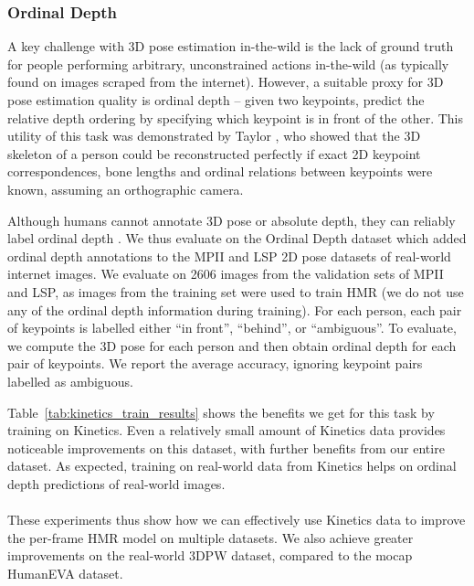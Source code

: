 \documentclass[10pt,twocolumn,letterpaper]{article}
\begin{document}
\subsubsection{Ordinal Depth}

A key challenge with 3D pose estimation in-the-wild is the lack of ground truth for people performing arbitrary, unconstrained actions in-the-wild (as typically found on images scraped from the internet).  
However, a suitable proxy for 3D pose estimation quality is ordinal depth \cite{taylor_cviu_2000, pavlakos_cvpr_2018b} -- \ie given two keypoints, predict the relative depth ordering by specifying which keypoint is in front of the other.
This utility of this task was demonstrated by Taylor \cite{taylor_cviu_2000}, who showed that the 3D skeleton of a person could be reconstructed perfectly if exact 2D keypoint correspondences, bone lengths and ordinal relations between keypoints were known, assuming an orthographic camera.

Although humans cannot annotate 3D pose or absolute depth, they can reliably label ordinal depth \cite{pavlakos_cvpr_2018b}.
We thus evaluate on the Ordinal Depth dataset \cite{pavlakos_cvpr_2018b} which added ordinal depth annotations to the MPII \cite{andriluka_cvpr_2014} and LSP \cite{johnson_bmvc_2010} 2D pose datasets of real-world internet images.
We evaluate on 2606 images from the validation sets of MPII and LSP, as images from the training set were used to train HMR (we do not use any of the ordinal depth information during training).
For each person, each pair of keypoints is labelled either ``in front'', ``behind'', or ``ambiguous''.
To evaluate, we compute the 3D pose for each person and then obtain ordinal depth for each pair of keypoints.
We report the average accuracy, ignoring keypoint pairs labelled as ambiguous.

Table~\ref{tab:kinetics_train_results} shows the benefits we get for this task by training on Kinetics.
Even a relatively small amount of Kinetics data provides noticeable improvements on this dataset, with further benefits from our entire dataset.
As expected, training on real-world data from Kinetics helps on ordinal depth predictions of real-world images.

\paragraph{} These experiments thus show how we can effectively
use Kinetics data to improve the per-frame HMR model on
multiple datasets.
We also achieve greater improvements on the real-world 3DPW dataset, compared to the mocap HumanEVA dataset.
\end{document}
